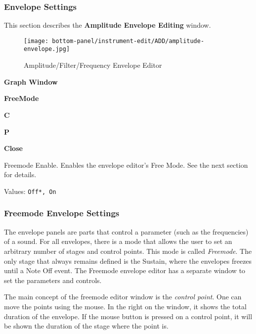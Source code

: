 \subsubsection{Envelope Settings}
\label{subsubsec:envelope_settings}

   This section describes the \textbf{Amplitude Envelope Editing} window.

\begin{figure}[H]
   \centering
   \texttt{[image: bottom-panel/instrument-edit/ADD/amplitude-envelope.jpg]}
   \caption{Amplitude/Filter/Frequency Envelope Editor}
   \label{fig:amplitude_envelope_editor}
\end{figure}

   \begin{enumber}
      \item \textbf{Graph Window}
      \item \textbf{FreeMode}
      \item \textbf{C}
      \item \textbf{P}
      \item \textbf{Close}
   \end{enumber}

   \setcounter{ItemCounter}{0}      %

   Freemode Enable.
   Enables the envelope editor's Free Mode.
   See the next section for details.

   Values: \texttt{Off*, On} \\

\subsubsection{Freemode Envelope Settings}
\label{subsubsec:freemode_envelope_settings}

   The envelope panels are parts that control a parameter (such as the
   frequencies) of a sound.  For all envelopes, there is a mode that allows the
   user to set an arbitrary number of stages and control points. This mode is
   called \textsl{Freemode}.  The only stage that always remains defined is the
   Sustain, where the envelopes freezes until a Note Off event.  The Freemode
   envelope editor has a separate window to set the parameters and controls.

   The main concept of the freemode editor window is the
   \textsl{control point}.
   One can move the points using the mouse. In the right on the
   window, it shows the total duration of the envelope. If the mouse button
   is pressed on a control point, it will be shown the duration of the
   stage where the point is.

